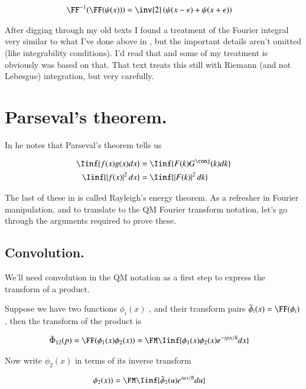 \begin{align*}
\FF^{-1}(\FF(\psi(x))) &= \inv{2} \left( \psi(x -\epsilon) + \psi(x + \epsilon) \right)
\end{align*}

After digging through my old texts I found a treatment of the Fourier integral very similar to what I've done above
in \cite{lepage1980cva}, but the important details aren't omitted (like integrability conditions).
I'd read that and some of my treatment is obviously was based on that.  That text 
treats this still with Riemann (and not Lebesgue) integration, but very carefully.

\section{Parseval's theorem. }

In \cite{mcmahon2005qmd} he notes that Parseval's theorem tells us

\begin{align*}
\Iinf{f(x)g(x) dx} &= \Iinf{F(k)G^\conj(k) dk} \\
\Iinf{\Abs{f(x)}^2 dx} &= \Iinf{\Abs{F(k)}^2 dk}
\end{align*}

The last of these in \cite{haykin1994cs} is called Rayleigh's energy theorem.  
As a refresher in 
Fourier manipulation, and to translate to the QM Fourier transform notation, let's go through the arguments
required to prove these.

\subsection{Convolution. }

We'll need convolution in the QM notation as a first step to express
the transform of a product.

Suppose we have two functions 
$\phi_i(x)$
, and their transform
pairs 
$\tilde{\phi}_i(x) = \FF(\phi_i)$, then the transform of the product is

\begin{align*}
\tilde{\Phi}_{12}(p) = \FF(\phi_1(x)\phi_2(x)) &= \FM \Iinf{\phi_1(x) \phi_2(x) e^{-ipx/\hbar} dx}
\end{align*}

Now write $\phi_2(x)$ in terms of its inverse transform

\begin{align*}
\phi_2(x)) &= \FM \Iinf{\tilde{\phi}_2(u) e^{iux/\hbar} du}
\end{align*}

